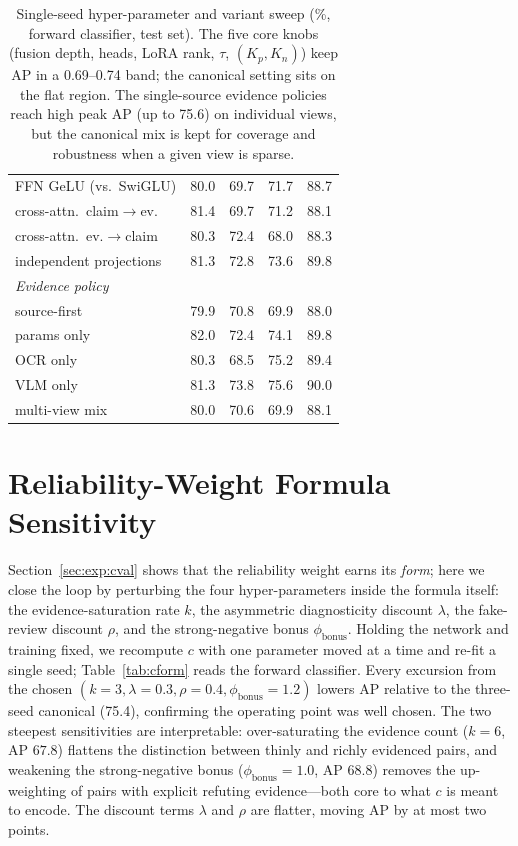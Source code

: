 \documentclass[11pt]{article}
\begin{document}
\begin{table}[h]
\begin{tabular}{lcccc}
\quad FFN GeLU (vs.\ SwiGLU)      & 80.0 & 69.7 & 71.7 & 88.7 \\
\quad cross-attn.\ claim$\to$ev.\ & 81.4 & 69.7 & 71.2 & 88.1 \\
\quad cross-attn.\ ev.$\to$claim  & 80.3 & 72.4 & 68.0 & 88.3 \\
\quad independent projections     & 81.3 & 72.8 & 73.6 & 89.8 \\
\multicolumn{5}{l}{\emph{Evidence policy}}\\
\quad source-first               & 79.9 & 70.8 & 69.9 & 88.0 \\
\quad params only                & 82.0 & 72.4 & 74.1 & 89.8 \\
\quad OCR only                   & 80.3 & 68.5 & 75.2 & 89.4 \\
\quad VLM only                   & 81.3 & 73.8 & 75.6 & 90.0 \\
\quad multi-view mix             & 80.0 & 70.6 & 69.9 & 88.1 \\
\bottomrule
\end{tabular}
\caption{Single-seed hyper-parameter and variant sweep (\%, forward classifier,
test set). The five core knobs (fusion depth, heads, LoRA rank, $\tau$,
$(K_p,K_n)$) keep AP in a 0.69--0.74 band; the canonical setting sits on the flat
region. The single-source evidence policies reach high peak AP (up to 75.6) on
individual views, but the canonical mix is kept for coverage and robustness when
a given view is sparse.}
\label{tab:sweep}
\end{table}

\section{Reliability-Weight Formula Sensitivity}
\label{app:cform}

Section~\ref{sec:exp:cval} shows that the reliability weight earns its
\emph{form}; here we close the loop by perturbing the four hyper-parameters
inside the formula itself: the evidence-saturation rate $k$, the asymmetric
diagnosticity discount $\lambda$, the fake-review discount $\rho$, and the
strong-negative bonus $\phi_{\mathrm{bonus}}$. Holding the network and training
fixed, we recompute $c$ with one parameter moved at a time and re-fit a single
seed; Table~\ref{tab:cform} reads the forward classifier. Every excursion from
the chosen $(k{=}3,\lambda{=}0.3,\rho{=}0.4,\phi_{\mathrm{bonus}}{=}1.2)$ lowers
AP relative to the three-seed canonical (75.4), confirming the operating point
was well chosen. The two steepest sensitivities are interpretable: over-saturating
the evidence count ($k{=}6$, AP $67.8$) flattens the distinction between thinly
and richly evidenced pairs, and weakening the strong-negative bonus
($\phi_{\mathrm{bonus}}{=}1.0$, AP $68.8$) removes the up-weighting of pairs with
explicit refuting evidence---both core to what $c$ is meant to encode. The
discount terms $\lambda$ and $\rho$ are flatter, moving AP by at most two points.
\end{document}
